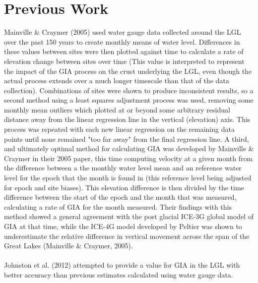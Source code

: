 \section{Previous Work} 
Mainville \& Craymer (2005) used water gauge data collected around the LGL over the past 150 years to
 create monthly means of water level. Differences in these values between sites
 were then plotted against time to calculate a rate of elevation change between
 sites over time (This value is interpreted to represent the impact of the GIA
 process on the crust underlying the LGL, even though the actual process extends
 over a much longer timescale than that of the data collection). Combinations of sites were shown to produce
 inconsistent results, so a second method using a least squares adjustment process was used,
 removing some monthly mean outliers which plotted at or beyond some arbitrary residual distance away 
 from the linear regression line in the vertical (elevation) axis. 
 This process was repeated with each new linear regression on the remaining data
 points until none remained "too far away" from
 the final regression line. A third, and ultimately optimal method for calculating
 GIA was developed by
 Mainville \& Craymer in their 2005 paper, this time computing velocity at a given
 month from the difference between a
 the monthly water level mean and an reference water level for the epoch that the 
 month is found in (this 
 reference level being adjusted for epoch
 and site biases). This elevation difference is then divided by the time difference
 between the start of the epoch and the month that was measured, calculating a rate
 of GIA for the month measured. Their findings with this method showed a general agreement with the post glacial
 ICE-3G global model of GIA at that time, while the ICE-4G model developed by Peltier
 was shown to underestimate the relative difference in vertical movement across
 the span of the Great Lakes (Mainville \& Craymer, 2005).\\ \\
Johnston et al. (2012) attempted to provide a value for GIA in the LGL with
 better accuracy than previous estimates calculated using water
 gauge data.
 
